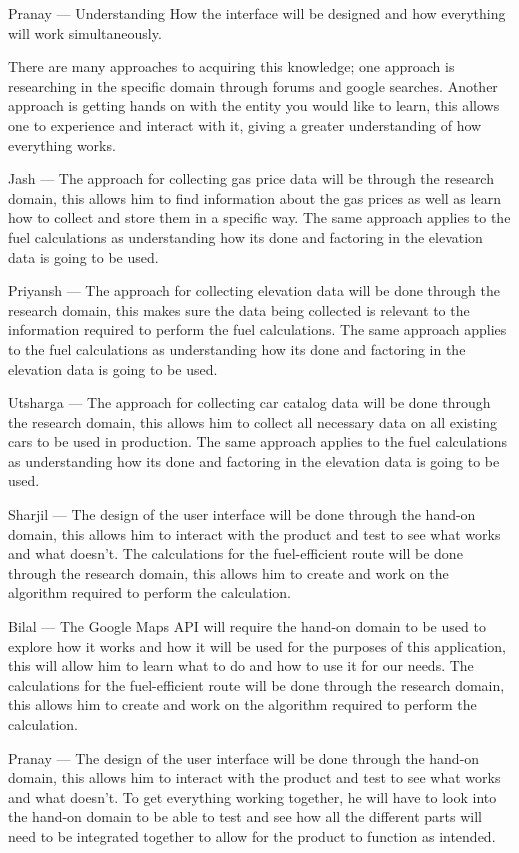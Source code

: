 \documentclass[12pt]{article}
\begin{document}
\bigskip

\noindent Pranay --- Understanding How the interface will be designed and how everything will work simultaneously.

\bigskip

There are many approaches to acquiring this knowledge; one approach is researching in the specific domain through forums and google searches. Another approach is getting hands on with the entity you would like to learn, this allows one to experience and interact with it, giving a greater understanding of how everything works.

\bigskip

\noindent Jash --- The approach for collecting gas price data will be through the research domain, this allows him to find information about the gas prices as well as learn how to collect and store them in a specific way. The same approach applies to the fuel calculations as understanding how its done and factoring in the elevation data is going to be used.

\bigskip

\noindent Priyansh --- The approach for collecting elevation data will be done through the research domain, this makes sure the data being collected is relevant to the information required to perform the fuel calculations. The same approach applies to the fuel calculations as understanding how its done and factoring in the elevation data is going to be used.

\bigskip

\noindent Utsharga --- The approach for collecting car catalog data will be done through the research domain, this allows him to collect all necessary data on all existing cars to be used in production. The same approach applies to the fuel calculations as understanding how its done and factoring in the elevation data is going to be used.

\bigskip

\noindent Sharjil --- The design of the user interface will be done through the hand-on domain, this allows him to interact with the product and test to see what works and what doesn’t. The calculations for the fuel-efficient route will be done through the research domain, this allows him to create and work on the algorithm required to perform the calculation.

\bigskip

\noindent Bilal --- The Google Maps API will require the hand-on domain to be used to explore how it works and how it will be used for the purposes of this application, this will allow him to learn what to do and how to use it for our needs. The calculations for the fuel-efficient route will be done through the research domain, this allows him to create and work on the algorithm required to perform the calculation.

\bigskip

\noindent Pranay --- The design of the user interface will be done through the hand-on domain, this allows him to interact with the product and test to see what works and what doesn’t. To get everything working together, he will have to look into the hand-on domain to be able to test and see how all the different parts will need to be integrated together to allow for the product to function as intended.
\end{document}
